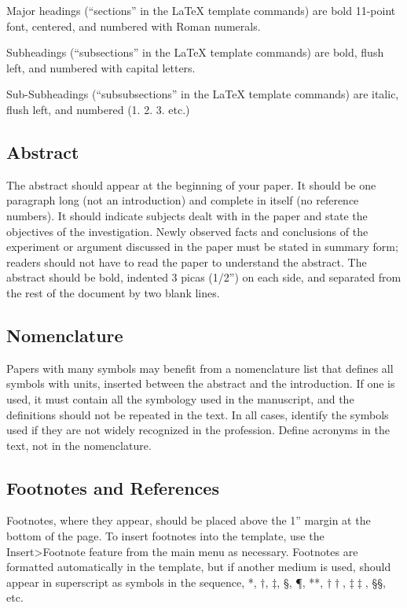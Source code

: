 \documentclass[conf]{new-aiaa}
\begin{document}
Major headings (``sections'' in the \LaTeX{} template commands) are bold 11-point font, centered, and numbered with Roman numerals.

Subheadings (``subsections'' in the \LaTeX{} template commands) are bold, flush left, and numbered with capital letters. 

Sub-Subheadings (``subsubsections'' in the \LaTeX{} template commands) are italic, flush left, and numbered (1. 2. 3. etc.)


\subsection{Abstract}
The abstract should appear at the beginning of your paper. It should be one paragraph long (not an introduction) and complete in itself (no reference numbers). It should indicate subjects dealt with in the paper and state the objectives of the investigation. Newly observed facts and conclusions of the experiment or argument discussed in the paper must be stated in summary form; readers should not have to read the paper to understand the abstract. The abstract should be bold, indented 3 picas (1/2'') on each side, and separated from the rest of the document by two blank lines.

\subsection{Nomenclature}
Papers with many symbols may benefit from a nomenclature list that defines all symbols with units, inserted between the abstract and the introduction. If one is used, it must contain all the symbology used in the manuscript, and the definitions should not be repeated in the text. In all cases, identify the symbols used if they are not widely recognized in the profession. Define acronyms in the text, not in the nomenclature.

\subsection{Footnotes and References}
Footnotes, where they appear, should be placed above the 1'' margin at the bottom of the page. To insert footnotes into the template, use the Insert>Footnote feature from the main menu as necessary. Footnotes are formatted automatically in the template, but if another medium is used, should appear in superscript as symbols in the sequence, *, $\dag$, $\ddag$, \S, \P, **, $\dag\dag$, $\ddag\ddag$, \S\S, etc.
\end{document}
